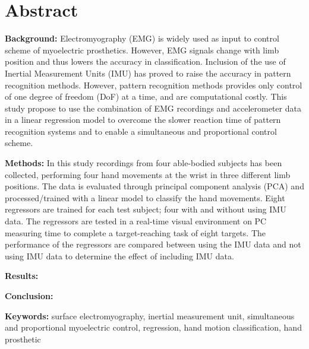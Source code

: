 \section{Abstract}

\textbf{Background:} Electromyography (EMG) is widely used as input to control scheme of myoelectric prosthetics. However, EMG signals change with limb position and thus lowers the accuracy in classification.%
Inclusion of the use of Inertial Measurement Units (IMU) has proved to raise the accuracy in pattern recognition methods. However, pattern recognition methods provides only control of one degree of freedom (DoF) at a time, and are computational costly. This study propose to use the combination of EMG recordings and accelerometer data in a linear regression model to overcome the slower reaction time of pattern recognition systems and to enable a simultaneous and proportional control scheme. 


\textbf{Methods:} In this study recordings from four able-bodied subjects has been collected, performing four hand movements at the wrist in three different limb positions. The data is evaluated through principal component analysis (PCA) and processed/trained with a linear model to classify the hand movements. Eight regressors are trained for each test subject; four with and without using IMU data. The regressors are tested in a real-time visual environment on PC measuring time to complete a target-reaching task of eight targets. The performance of the regressors are compared between using the IMU data and not using IMU data to determine the effect of including IMU data. 




\textbf{Results:} 


\textbf{Conclusion:} 


\textbf{Keywords:} surface electromyography, inertial measurement unit, simultaneous and proportional myoelectric control, regression, hand motion classification, hand prosthetic
